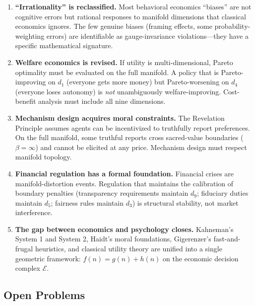 \documentclass[12pt]{article}
\theoremstyle{definition}
\theoremstyle{remark}
\newcommand{\E}{\mathcal{E}}               %
\begin{document}
\begin{enumerate}
    \item \textbf{``Irrationality'' is reclassified.}  Most behavioral economics ``biases'' are not cognitive errors but rational responses to manifold dimensions that classical economics ignores.  The few genuine biases (framing effects, some probability-weighting errors) are identifiable as gauge-invariance violations---they have a specific mathematical signature.

    \item \textbf{Welfare economics is revised.}  If utility is multi-dimensional, Pareto optimality must be evaluated on the full manifold.  A policy that is Pareto-improving on $d_1$ (everyone gets more money) but Pareto-worsening on $d_4$ (everyone loses autonomy) is \emph{not} unambiguously welfare-improving.  Cost-benefit analysis must include all nine dimensions.

    \item \textbf{Mechanism design acquires moral constraints.}  The Revelation Principle assumes agents can be incentivized to truthfully report preferences.  On the full manifold, some truthful reports cross sacred-value boundaries ($\beta = \infty$) and cannot be elicited at any price.  Mechanism design must respect manifold topology.

    \item \textbf{Financial regulation has a formal foundation.}  Financial crises are manifold-distortion events.  Regulation that maintains the calibration of boundary penalties (transparency requirements maintain $d_9$; fiduciary duties maintain $d_5$; fairness rules maintain $d_3$) is structural stability, not market interference.

    \item \textbf{The gap between economics and psychology closes.}  Kahneman's System 1 and System 2, Haidt's moral foundations, Gigerenzer's fast-and-frugal heuristics, and classical utility theory are unified into a single geometric framework: $f(n) = g(n) + h(n)$ on the economic decision complex $\E$.
\end{enumerate}

\subsection{Open Problems}
\end{document}
